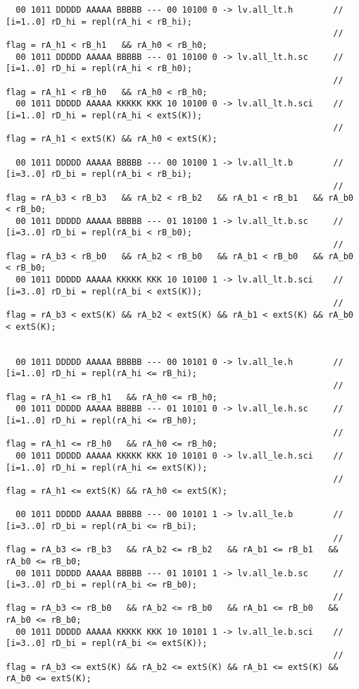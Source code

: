 \begin{landscape}
{\clearpage
\begin{verbatim}
  00 1011 DDDDD AAAAA BBBBB --- 00 10100 0 -> lv.all_lt.h        // [i=1..0] rD_hi = repl(rA_hi < rB_hi);    
                                                                 // flag = rA_h1 < rB_h1   && rA_h0 < rB_h0;
  00 1011 DDDDD AAAAA BBBBB --- 01 10100 0 -> lv.all_lt.h.sc     // [i=1..0] rD_hi = repl(rA_hi < rB_h0);    
                                                                 // flag = rA_h1 < rB_h0   && rA_h0 < rB_h0;
  00 1011 DDDDD AAAAA KKKKK KKK 10 10100 0 -> lv.all_lt.h.sci    // [i=1..0] rD_hi = repl(rA_hi < extS(K));  
                                                                 // flag = rA_h1 < extS(K) && rA_h0 < extS(K);

  00 1011 DDDDD AAAAA BBBBB --- 00 10100 1 -> lv.all_lt.b        // [i=3..0] rD_bi = repl(rA_bi < rB_bi);    
                                                                 // flag = rA_b3 < rB_b3   && rA_b2 < rB_b2   && rA_b1 < rB_b1   && rA_b0 < rB_b0;
  00 1011 DDDDD AAAAA BBBBB --- 01 10100 1 -> lv.all_lt.b.sc     // [i=3..0] rD_bi = repl(rA_bi < rB_b0);    
                                                                 // flag = rA_b3 < rB_b0   && rA_b2 < rB_b0   && rA_b1 < rB_b0   && rA_b0 < rB_b0;
  00 1011 DDDDD AAAAA KKKKK KKK 10 10100 1 -> lv.all_lt.b.sci    // [i=3..0] rD_bi = repl(rA_bi < extS(K));  
                                                                 // flag = rA_b3 < extS(K) && rA_b2 < extS(K) && rA_b1 < extS(K) && rA_b0 < extS(K);


  00 1011 DDDDD AAAAA BBBBB --- 00 10101 0 -> lv.all_le.h        // [i=1..0] rD_hi = repl(rA_hi <= rB_hi);   
                                                                 // flag = rA_h1 <= rB_h1   && rA_h0 <= rB_h0;
  00 1011 DDDDD AAAAA BBBBB --- 01 10101 0 -> lv.all_le.h.sc     // [i=1..0] rD_hi = repl(rA_hi <= rB_h0);   
                                                                 // flag = rA_h1 <= rB_h0   && rA_h0 <= rB_h0;
  00 1011 DDDDD AAAAA KKKKK KKK 10 10101 0 -> lv.all_le.h.sci    // [i=1..0] rD_hi = repl(rA_hi <= extS(K)); 
                                                                 // flag = rA_h1 <= extS(K) && rA_h0 <= extS(K);

  00 1011 DDDDD AAAAA BBBBB --- 00 10101 1 -> lv.all_le.b        // [i=3..0] rD_bi = repl(rA_bi <= rB_bi);   
                                                                 // flag = rA_b3 <= rB_b3   && rA_b2 <= rB_b2   && rA_b1 <= rB_b1   && rA_b0 <= rB_b0;
  00 1011 DDDDD AAAAA BBBBB --- 01 10101 1 -> lv.all_le.b.sc     // [i=3..0] rD_bi = repl(rA_bi <= rB_b0);   
                                                                 // flag = rA_b3 <= rB_b0   && rA_b2 <= rB_b0   && rA_b1 <= rB_b0   && rA_b0 <= rB_b0;
  00 1011 DDDDD AAAAA KKKKK KKK 10 10101 1 -> lv.all_le.b.sci    // [i=3..0] rD_bi = repl(rA_bi <= extS(K)); 
                                                                 // flag = rA_b3 <= extS(K) && rA_b2 <= extS(K) && rA_b1 <= extS(K) && rA_b0 <= extS(K);
\end{verbatim}}



\end{landscape}
